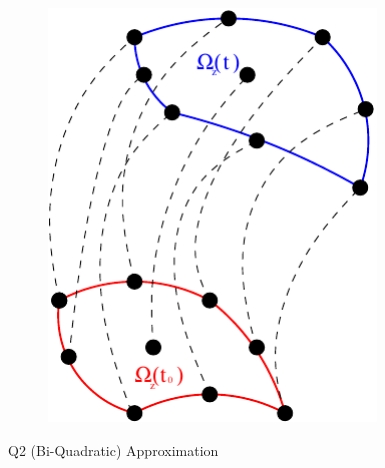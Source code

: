 \documentclass[notes=hide,8pt,xcolor=svgnames]{beamer}
\begin{document}
\begin{frame}
\begin{columns}[T]
\begin{column}{0.6\textwidth}
\begin{columns}[b]
\begin{column}{0.5\textwidth}
\begin{figure}[h!]
    \includegraphics[width=0.9\textwidth,keepaspectratio=true]{figures/Motion-Q2.pdf}
    \end{figure}
    \parbox{0.8\textwidth}{\centering \small
    Q2 (Bi-Quadratic) Approximation}
    \end{column}
    \end{columns}
  \end{column}
  \begin{column}{0.35\textwidth}


\end{column}
\end{columns}
\end{frame}
\end{document}
